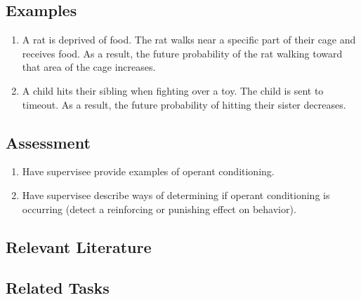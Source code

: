 \subsection{Examples}
\begin{enumerate}
\item   A rat is deprived of food. The rat walks near a specific part of their cage and receives food. As a result, the future probability of the rat walking toward that area of the cage increases.
\item A child hits their sibling when fighting over a toy. The child is sent to timeout. As a result, the future probability of hitting their sister decreases.
%
\end{enumerate}
%
\subsection{Assessment}
\begin{enumerate}
\item Have supervisee provide examples of operant conditioning.
\item Have supervisee describe ways of determining if operant conditioning is occurring (detect a reinforcing or punishing effect on behavior).
%
\end{enumerate}
%
\subsection{Relevant Literature}
\begin{refsection}
\nocite{test,alang2017police,clayton2018black}
\printbibliography[heading=none]
\end{refsection}
%
\subsection{Related Tasks}
\fourFKFifteen{}\\
\fourFKThirtyOne{}\\
\fourFKThirtyThree{}\\
%

%
%
%
%
%
\section{\fourFKSixteen{}}
